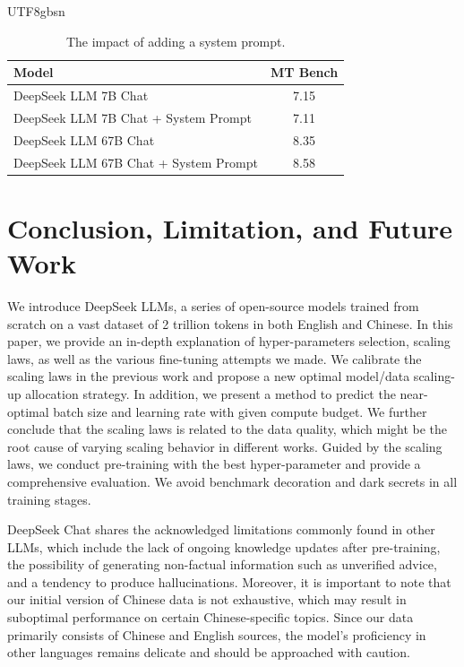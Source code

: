 \documentclass[11pt, a4paper, logo, copyright, nonumbering]{deepseek}
\begin{document}
\begin{CJK*}{UTF8}{gbsn}
\begin{table}[ht]
\centering
\begin{tabular}{lc}
	\toprule  \small
Model &  MT Bench \\ \midrule
DeepSeek LLM 7B Chat & 7.15 \\ 
DeepSeek LLM 7B Chat + System Prompt & 7.11 \\ 	 
DeepSeek LLM 67B Chat & 8.35
\\ 
DeepSeek LLM 67B Chat + System Prompt & 8.58\\ 	
\bottomrule
\end{tabular}
\caption{\centering The impact of adding a system prompt.}
\label{table:prompt}
\end{table}

\section{Conclusion, Limitation, and Future Work}
\label{sec:conclusion}

We introduce DeepSeek LLMs, a series of open-source models trained from scratch on a vast dataset of 2 trillion tokens in both English and Chinese.  In this paper, we provide an in-depth explanation of hyper-parameters selection, scaling laws, as well as the various fine-tuning attempts we made. We calibrate the scaling laws in the previous work and propose a new optimal model/data scaling-up allocation strategy. In addition, we 
 present a method to predict the near-optimal batch size and learning rate with given compute budget. We further conclude that the scaling laws is related to the data quality, which might be the root cause of varying scaling behavior in different works. Guided by the scaling laws, we conduct pre-training with the best hyper-parameter and provide a comprehensive evaluation. We avoid benchmark decoration and dark secrets in all training stages.

DeepSeek Chat shares the acknowledged limitations commonly found in other LLMs, which include the lack of ongoing knowledge updates after pre-training, the possibility of generating non-factual information such as unverified advice, and a tendency to produce hallucinations. Moreover, it is important to note that our initial version of Chinese data is not exhaustive, which may result in suboptimal performance on certain Chinese-specific topics. Since our data primarily consists of Chinese and English sources, the model's proficiency in other languages remains delicate and should be approached with caution. 


\end{CJK*}
\end{document}
